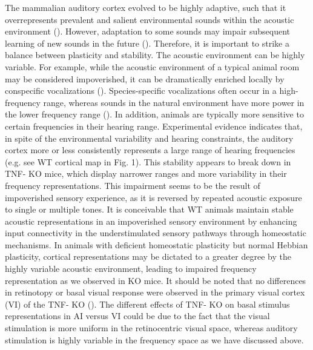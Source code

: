 The mammalian auditory cortex evolved to be highly adaptive, such that it overrepresents prevalent and salient environmental sounds within the acoustic environment (\cite{Diamond1986, Gonzalez-Lima1986, Ohl1996, Pantev1998, Edeline1998, Gao2000, Zhang2001, Syka2002, Fritz2003, Mrsic-Flogel2003, Dean2005, Popescu2010, Cohen2011, Takahashi2011}). However, adaptation to some sounds may impair subsequent learning of new sounds in the future (\cite{Sarro2011}). Therefore, it is important to strike a balance between plasticity and stability. The acoustic environment can be highly variable. For example, while the acoustic environment of a typical animal room may be considered impoverished, it can be dramatically enriched locally by conspecific vocalizations (\cite{Kim2009, Grimsley2011}). Species-specific vocalizations often occur in a high-frequency range, whereas sounds in the natural environment have more power in the lower frequency range (\cite{Liu2003, Kim2009}). In addition, animals are typically more sensitive to certain frequencies in their hearing range. Experimental evidence indicates that, in spite of the environmental variability and hearing constraints, the auditory cortex more or less consistently represents a large range of hearing frequencies (e.g. see WT cortical map in Fig. 1). This stability appears to break down in TNF-\textalpha{} KO mice, which display narrower ranges and more variability in their frequency representations. This impairment seems to be the result of impoverished sensory experience, as it is reversed by repeated acoustic exposure to single or multiple tones. It is conceivable that WT animals maintain stable acoustic representations in an impoverished sensory environment by enhancing input connectivity in the understimulated sensory pathways through homeostatic mechanisms. In animals with deficient homeostatic plasticity but normal Hebbian plasticity, cortical representations may be dictated to a greater degree by the highly variable acoustic environment, leading to impaired frequency representation as we observed in KO mice. It should be noted that no differences in retinotopy or basal visual response were observed in the primary visual cortex (VI) of the TNF-\textalpha{} KO (\cite{Kaneko2008}). The different effects of TNF-\textalpha{} KO on basal stimulus representations in AI versus VI could be due to the fact that the visual stimulation is more uniform in the retinocentric visual space, whereas auditory stimulation is highly variable in the frequency space as we have discussed above.

